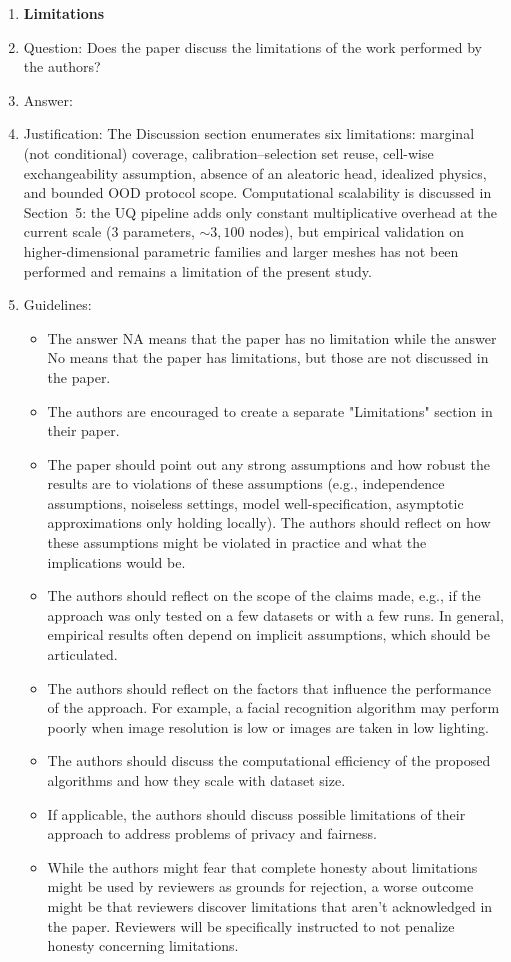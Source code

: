 \documentclass{article}
\begin{document}
\begin{enumerate}
\item {\bf Limitations}
    \item[] Question: Does the paper discuss the limitations of the work performed by the authors?
    \item[] Answer: \answerYes{}
    \item[] Justification: The Discussion section enumerates six limitations: marginal (not conditional) coverage, calibration--selection set reuse, cell-wise exchangeability assumption, absence of an aleatoric head, idealized physics, and bounded OOD protocol scope. Computational scalability is discussed in Section~5: the UQ pipeline adds only constant multiplicative overhead at the current scale (3 parameters, $\sim 3{,}100$ nodes), but empirical validation on higher-dimensional parametric families and larger meshes has not been performed and remains a limitation of the present study.
    \item[] Guidelines:
    \begin{itemize}
        \item The answer NA means that the paper has no limitation while the answer No means that the paper has limitations, but those are not discussed in the paper.
        \item The authors are encouraged to create a separate "Limitations" section in their paper.
        \item The paper should point out any strong assumptions and how robust the results are to violations of these assumptions (e.g., independence assumptions, noiseless settings, model well-specification, asymptotic approximations only holding locally). The authors should reflect on how these assumptions might be violated in practice and what the implications would be.
        \item The authors should reflect on the scope of the claims made, e.g., if the approach was only tested on a few datasets or with a few runs. In general, empirical results often depend on implicit assumptions, which should be articulated.
        \item The authors should reflect on the factors that influence the performance of the approach. For example, a facial recognition algorithm may perform poorly when image resolution is low or images are taken in low lighting.
        \item The authors should discuss the computational efficiency of the proposed algorithms and how they scale with dataset size.
        \item If applicable, the authors should discuss possible limitations of their approach to address problems of privacy and fairness.
        \item While the authors might fear that complete honesty about limitations might be used by reviewers as grounds for rejection, a worse outcome might be that reviewers discover limitations that aren't acknowledged in the paper. Reviewers will be specifically instructed to not penalize honesty concerning limitations.
    \end{itemize}


\end{enumerate}
\end{document}
